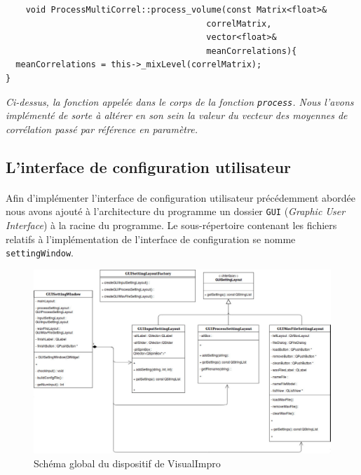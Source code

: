  \begin{lstlisting}
    void ProcessMultiCorrel::process_volume(const Matrix<float>&
                                        correlMatrix,
                                        vector<float>&
                                        meanCorrelations){
  meanCorrelations = this->_mixLevel(correlMatrix);
}
  \end{lstlisting}
  \begin{center}
    \textit{Ci-dessus, la fonction appelée dans le corps de la fonction \verb!process!. Nous l'avons implémenté de sorte à altérer en son sein la valeur du vecteur des moyennes de corrélation passé par référence en paramètre.}
  \end{center}

\subsection{L'interface de configuration utilisateur}
\paragraph{}
Afin d'implémenter l'interface de configuration utilisateur précédemment abordée
nous avons ajouté à l'architecture du programme un dossier
\verb!GUI! (\textit{Graphic User Interface}) à la racine du programme.
Le sous-répertoire contenant les fichiers relatifs à l'implémentation de
l'interface de configuration se nomme \verb!settingWindow!.

\begin{figure}[h]
 \centering
 \includegraphics[scale=0.3]{assets/umlSettingWindow.png}
 \caption{Schéma global du dispositif de VisualImpro}
 \label{schéma global}
\end{figure}

